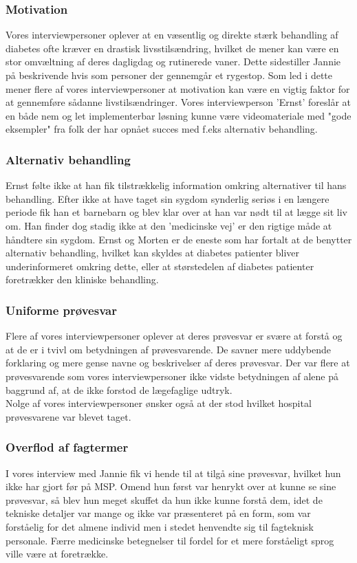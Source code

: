 \subsubsection{Motivation}
Vores interviewpersoner oplever at en væsentlig og direkte stærk behandling af diabetes ofte kræver en drastisk livsstilsændring, hvilket de mener kan være en stor omvæltning af deres dagligdag og rutinerede vaner. Dette sidestiller Jannie på beskrivende hvis som personer der gennemgår et rygestop. Som led i dette mener flere af vores interviewpersoner at motivation kan være en vigtig faktor for at gennemføre sådanne livstilsændringer. Vores interviewperson 'Ernst' foreslår at en både nem og let implementerbar løsning kunne være videomateriale med "gode eksempler" fra folk der har opnået succes med f.eks alternativ behandling.

\subsubsection{Alternativ behandling}
Ernst følte ikke at han fik tilstrækkelig information omkring alternativer til hans behandling. Efter ikke at have taget sin sygdom synderlig seriøs i en længere periode fik han et barnebarn og blev klar over at han var nødt til at lægge sit liv om. Han finder dog stadig ikke at den 'medicinske vej' er den rigtige måde at håndtere sin sygdom. Ernst og Morten er de eneste som har fortalt at de benytter alternativ behandling, hvilket kan skyldes at diabetes patienter bliver underinformeret omkring dette, eller at størstedelen af diabetes patienter foretrækker den kliniske behandling. 

\subsubsection{Uniforme prøvesvar}
Flere af vores interviewpersoner oplever at deres prøvesvar er svære at forstå og at de er i tvivl om betydningen af prøvesvarende. De savner mere uddybende forklaring og mere gense navne og beskrivelser af deres prøvesvar. 
Der var flere at prøvesvarende som vores interviewpersoner ikke vidste betydningen af alene på baggrund af, at de ikke forstod de lægefaglige udtryk.\\
Nolge af vores interviewpersoner ønsker også at der stod hvilket hospital prøvesvarene var blevet taget.

\subsubsection{Overflod af fagtermer}
I vores interview med Jannie fik vi hende til at tilgå sine prøvesvar, hvilket hun ikke har gjort før på MSP. Omend hun først var henrykt over at kunne se sine prøvesvar, så blev hun meget skuffet da hun ikke kunne forstå dem, idet de tekniske detaljer var mange og ikke var præsenteret på en form, som var forståelig for det almene individ men i stedet henvendte sig til fagteknisk personale. Færre medicinske betegnelser til fordel for et mere forståeligt sprog ville være at foretrække. 

